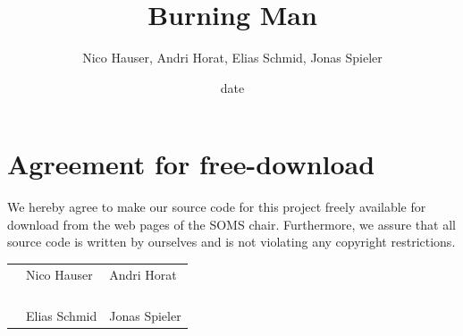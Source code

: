 \documentclass[11pt]{article}
\title{Burning Man}
\author{Nico Hauser, Andri Horat, Elias Schmid, Jonas Spieler}
\date{date}
\begin{document}

\newpage


\newpage
\section*{Agreement for free-download}
\bigskip


\bigskip


\large We hereby agree to make our source code for this project freely available for download from the web pages of the SOMS chair. Furthermore, we assure that all source code is written by ourselves and is not violating any copyright restrictions.

\begin{center}

\bigskip


\bigskip


\begin{tabular}{@{}p{3.3cm}@{}p{6cm}@{}@{}p{6cm}@{}}
\begin{minipage}{3cm}

\end{minipage}
&
\begin{minipage}{6cm}
\vspace{2mm} \large Nico Hauser
 \vspace{\baselineskip}

\end{minipage}
&
\begin{minipage}{6cm}

\large Andri Horat

\end{minipage}
\\
\\
\\
\\
\\
\begin{minipage}{3cm}

\end{minipage}
&
\begin{minipage}{6cm}
\vspace{2mm} \large Elias Schmid

 \vspace{\baselineskip}

\end{minipage}
&
\begin{minipage}{6cm}

\large Jonas Spieler

\end{minipage}
\end{tabular}


\end{center}
\newpage
\end{document}
